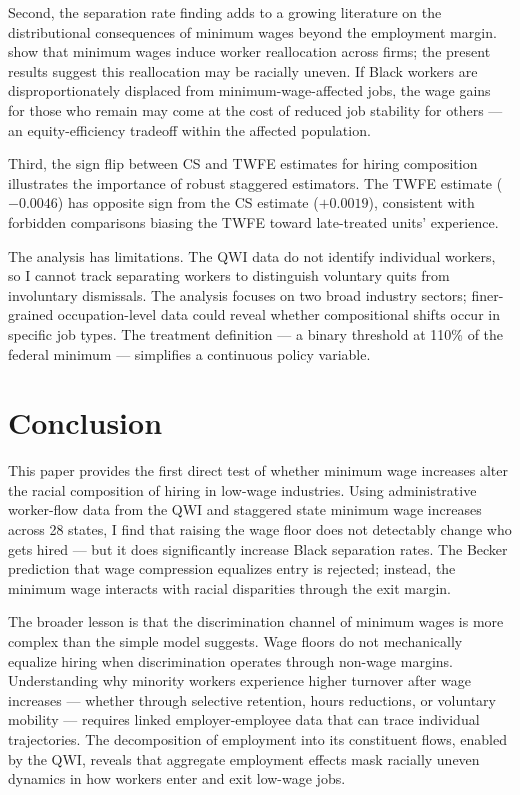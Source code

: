 \documentclass[12pt]{article}
\begin{document}
Second, the separation rate finding adds to a growing literature on the distributional consequences of minimum wages beyond the employment margin. \citet{dustmann2022reallocation} show that minimum wages induce worker reallocation across firms; the present results suggest this reallocation may be racially uneven. If Black workers are disproportionately displaced from minimum-wage-affected jobs, the wage gains for those who remain may come at the cost of reduced job stability for others --- an equity-efficiency tradeoff within the affected population.

Third, the sign flip between CS and TWFE estimates for hiring composition illustrates the importance of robust staggered estimators. The TWFE estimate ($-0.0046$) has opposite sign from the CS estimate ($+0.0019$), consistent with forbidden comparisons biasing the TWFE toward late-treated units' experience.

The analysis has limitations. The QWI data do not identify individual workers, so I cannot track separating workers to distinguish voluntary quits from involuntary dismissals. The analysis focuses on two broad industry sectors; finer-grained occupation-level data could reveal whether compositional shifts occur in specific job types. The treatment definition --- a binary threshold at 110\% of the federal minimum --- simplifies a continuous policy variable.


\section{Conclusion}

This paper provides the first direct test of whether minimum wage increases alter the racial composition of hiring in low-wage industries. Using administrative worker-flow data from the QWI and staggered state minimum wage increases across 28 states, I find that raising the wage floor does not detectably change who gets hired --- but it does significantly increase Black separation rates. The Becker prediction that wage compression equalizes entry is rejected; instead, the minimum wage interacts with racial disparities through the exit margin.

The broader lesson is that the discrimination channel of minimum wages is more complex than the simple model suggests. Wage floors do not mechanically equalize hiring when discrimination operates through non-wage margins. Understanding why minority workers experience higher turnover after wage increases --- whether through selective retention, hours reductions, or voluntary mobility --- requires linked employer-employee data that can trace individual trajectories. The decomposition of employment into its constituent flows, enabled by the QWI, reveals that aggregate employment effects mask racially uneven dynamics in how workers enter and exit low-wage jobs.
\end{document}
